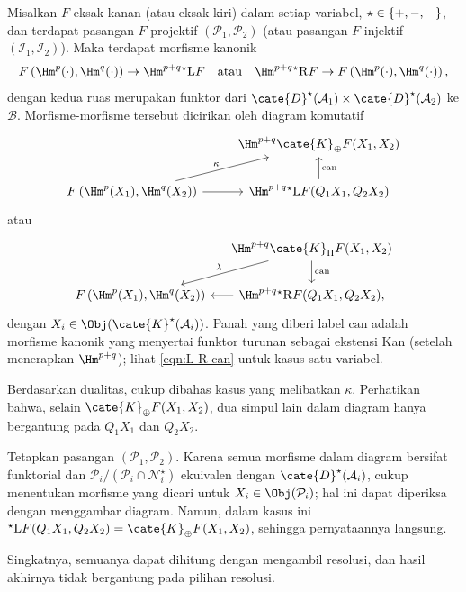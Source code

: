 \begin{proposisi}\label{prop:bifunctor-cup}
	Misalkan $F$ eksak kanan (atau eksak kiri) dalam setiap variabel,
	$\star\in\{+,-,\hspace{0.8em}\}$, dan terdapat pasangan $F$-projektif
	$(\mathcal{P}_1,\mathcal{P}_2)$ (atau pasangan $F$-injektif
	$(\mathcal{I}_1,\mathcal{I}_2)$). Maka terdapat morfisme kanonik
	\[ F\left(\Hm^p(\cdot), \Hm^q(\cdot) \right) \to \Hm^{p+q} {}^\star \mathrm{L}F \quad \text{atau} \quad \Hm^{p+q} {}^\star \mathrm{R}F \to F\left(\Hm^p(\cdot), \Hm^q(\cdot) \right), \]
	dengan kedua ruas merupakan funktor dari
	$\cate{D}^\star(\mathcal{A}_1)\times\cate{D}^\star(\mathcal{A}_2)$ ke
	$\mathcal{B}$. Morfisme-morfisme tersebut dicirikan oleh diagram komutatif
	\begin{equation*}
		\begin{tikzcd}
			& \Hm^{p+q} \cate{K}_{\oplus} F(X_1, X_2) \\
			F\left(\Hm^p(X_1), \Hm^q(X_2) \right) \arrow[r] \arrow[ru, "\kappa"] & \Hm^{p+q} {}^\star \mathrm{L}F(Q_1 X_1, Q_2 X_2) \arrow[u, "\mathrm{can}"']
		\end{tikzcd}
	\end{equation*}
	atau
	\begin{equation*}
		\begin{tikzcd}[column sep=small]
			& \Hm^{p+q} \cate{K}_{\Pi} F(X_1, X_2) \arrow[d, "\mathrm{can}"] \arrow[ld, "\lambda"'] \\
			F\left(\Hm^p(X_1), \Hm^q(X_2) \right) & \Hm^{p+q} {}^\star \mathrm{R}F(Q_1 X_1, Q_2 X_2), \arrow[l]
		\end{tikzcd}
	\end{equation*}
	dengan $X_i\in\Obj(\cate{K}^\star(\mathcal{A}_i))$. Panah yang diberi
	label $\mathrm{can}$ adalah morfisme kanonik yang menyertai funktor turunan
	sebagai ekstensi Kan (setelah menerapkan $\Hm^{p+q}$); lihat
	\eqref{eqn:L-R-can} untuk kasus satu variabel.
\end{proposisi}
\begin{bukti}
	Berdasarkan dualitas, cukup dibahas kasus yang melibatkan $\kappa$. Perhatikan
	bahwa, selain $\cate{K}_{\oplus}F(X_1,X_2)$, dua simpul lain dalam diagram
	hanya bergantung pada $Q_1X_1$ dan $Q_2X_2$.

	Tetapkan pasangan $(\mathcal{P}_1,\mathcal{P}_2)$. Karena semua morfisme dalam diagram
	bersifat funktorial dan
	$\mathcal{P}_i/(\mathcal{P}_i\cap\mathcal{N}^\star_i)$ ekuivalen dengan
	$\cate{D}^\star(\mathcal{A}_i)$, cukup menentukan morfisme yang dicari untuk
	$X_i\in\Obj(\mathcal{P}_i)$; hal ini dapat diperiksa dengan menggambar
	diagram. Namun, dalam kasus ini
	${}^\star\mathrm{L}F(Q_1X_1,Q_2X_2)=\cate{K}_{\oplus}F(X_1,X_2)$, sehingga
	pernyataannya langsung.
\end{bukti}

Singkatnya, semuanya dapat dihitung dengan mengambil resolusi, dan hasil
akhirnya tidak bergantung pada pilihan resolusi.
